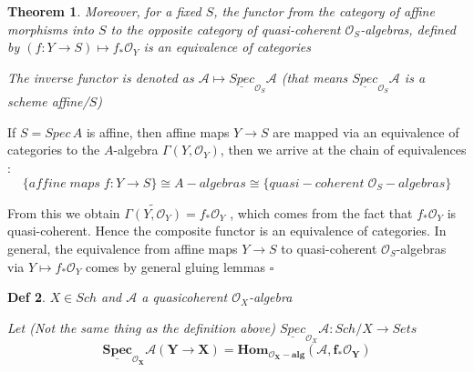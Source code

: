 \documentclass{article}
\newtheorem{theorem}{Theorem}[section]
\newtheorem{definition}[theorem]{Def}
\newenvironment{Proof}{{\noindent \indent \it Proof:\quad}}{\hfill $\square$\par}
\begin{document}
\begin{theorem}
    Moreover, for a fixed $S$, the functor from the category of affine morphisms into $S$ to the opposite category of quasi-coherent $\mathcal O_S$-algebras, defined by $(f : Y \to S) \mapsto f_\ast\mathcal O_Y$ is an equivalence of
categories

The inverse functor is denoted as $\mathcal A \mapsto \underline{Spec}_{\mathcal O_S}\mathcal A$ (that means $\underline{Spec}_{\mathcal O_S}\mathcal A$ is a scheme affine/$S$)
\end{theorem}
\begin{Proof}
If $S = Spec\, A$ is affine, then affine maps $Y \to S$ are mapped via an equivalence of categories to
the $A$-algebra $\Gamma(Y,\mathcal O_Y )$, then we arrive at the chain of equivalences :
$$
\{ affine\; maps\; f : Y \to S\} \cong {A-algebras} \cong \{quasi-coherent\;\mathcal O_S-algebras\}
$$

From this we obtain $\widetilde{\Gamma(Y, \mathcal O_Y)} = f_\ast\mathcal O_Y$ , which comes from the fact that $f_\ast\mathcal O_Y$ is quasi-coherent. Hence the composite functor is an equivalence of categories. In general, the equivalence from affine maps
$Y \to S$ to quasi-coherent $\mathcal O_S$-algebras via $Y \mapsto f_\ast\mathcal O_Y$ comes by general gluing lemmas
\end{Proof}

\begin{definition}
$X\in Sch$ and $\mathcal A$ a quasicoherent $\mathcal O_X$-algebra

Let (Not the same thing as the definition above) $\underline{Spec}_{\mathcal O_X}\mathcal A : Sch/X\to Sets$
$$
\bm{
\underline{Spec}_{\mathcal O_X}\mathcal A(Y\to X)=Hom_{\mathcal O_X-alg}(\mathcal A,f_\ast\mathcal O_Y)
}
$$
\end{definition}
\end{document}
